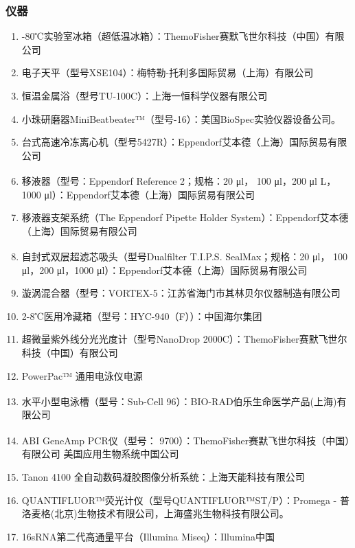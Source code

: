     \subsubsection{仪器}
    \begin{enumerate}
      \item -80℃实验室冰箱（超低温冰箱）：ThemoFisher赛默飞世尔科技（中国）有限公司
      \item 电子天平（型号XSE104）：梅特勒-托利多国际贸易（上海）有限公司
      \item 恒温金属浴（型号TU-100C）：上海一恒科学仪器有限公司
      \item 小珠研磨器MiniBeatbeater™（型号-16）：美国BioSpec实验仪器设备公司。
      \item 台式高速冷冻离心机（型号5427R）：Eppendorf艾本德（上海）国际贸易有限公司
      \item 移液器（型号：Eppendorf Reference\textsuperscript{\textregistered} 2；规格：20 μl， 100 μl，200 μl L，1000 μl）：Eppendorf艾本德（上海）国际贸易有限公司
      \item 移液器支架系统（The Eppendorf Pipette Holder System）：Eppendorf艾本德（上海）国际贸易有限公司
      \item 自封式双层超滤芯吸头（型号Dualfilter T.I.P.S.\textsuperscript{\textregistered} SealMax；规格：20 μl， 100 μl，200 μl，1000 μl）：Eppendorf艾本德（上海）国际贸易有限公司
      \item 漩涡混合器（型号：VORTEX-5：江苏省海门市其林贝尔仪器制造有限公司
      \item 2-8℃医用冷藏箱（型号：HYC-940（F））：中国海尔集团
      \item 超微量紫外线分光光度计（型号NanoDrop 2000C）：ThemoFisher赛默飞世尔科技（中国）有限公司
      \item PowerPac™ 通用电泳仪电源
      \item 水平小型电泳槽（型号：Sub-Cell\textsuperscript{\textregistered} 96）：BIO-RAD伯乐生命医学产品(上海)有限公司
      \item ABI GeneAmp\textsuperscript{\textregistered} PCR仪（型号： 9700）：ThemoFisher赛默飞世尔科技（中国）有限公司 美国应用生物系统中国公司
      \item Tanon 4100 全自动数码凝胶图像分析系统：上海天能科技有限公司
      \item QUANTIFLUOR™荧光计仪（型号QUANTIFLUOR™ST/P）：Promega - 普洛麦格(北京)生物技术有限公司，上海盛兆生物科技有限公司。
      \item 16sRNA第二代高通量平台（Illumina Miseq）：Illumina中国
    \end{enumerate}

